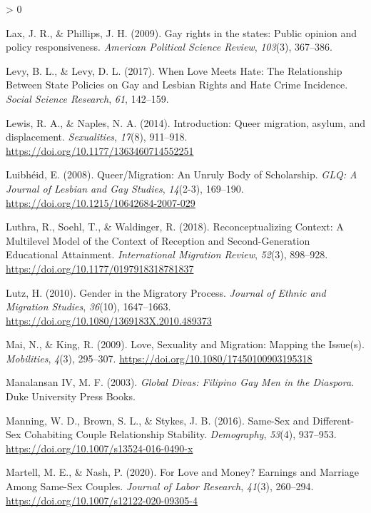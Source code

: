 \documentclass[
  12pt,
]{article}
\newlength{\cslhangindent}
\newenvironment{CSLReferences}[2] %
 {%
  \setlength{\parindent}{0pt}
  \ifodd #1 \everypar{\setlength{\hangindent}{\cslhangindent}}\ignorespaces\fi
  \ifnum #2 > 0
  \setlength{\parskip}{#2\baselineskip}
  \fi
 }%
 {}
\begin{document}
\begin{CSLReferences}{1}{0}
\leavevmode\hypertarget{ref-lax_2009}{}%
Lax, J. R., \& Phillips, J. H. (2009). Gay rights in the states: Public opinion and policy responsiveness. \emph{American Political Science Review}, \emph{103}(3), 367--386.

\leavevmode\hypertarget{ref-levy_2017}{}%
Levy, B. L., \& Levy, D. L. (2017). When {Love Meets Hate}: The {Relationship Between State Policies} on {Gay} and {Lesbian Rights} and {Hate Crime Incidence}. \emph{Social Science Research}, \emph{61}, 142--159.

\leavevmode\hypertarget{ref-lewis_2014}{}%
Lewis, R. A., \& Naples, N. A. (2014). Introduction: Queer migration, asylum, and displacement. \emph{Sexualities}, \emph{17}(8), 911--918. \url{https://doi.org/10.1177/1363460714552251}

\leavevmode\hypertarget{ref-luibheid_2008}{}%
Luibhéid, E. (2008). Queer/{Migration}: An {Unruly Body} of {Scholarship}. \emph{GLQ: A Journal of Lesbian and Gay Studies}, \emph{14}(2-3), 169--190. \url{https://doi.org/10.1215/10642684-2007-029}

\leavevmode\hypertarget{ref-luthra_2018}{}%
Luthra, R., Soehl, T., \& Waldinger, R. (2018). Reconceptualizing {Context}: A {Multilevel Model} of the {Context} of {Reception} and {Second}-{Generation Educational Attainment}. \emph{International Migration Review}, \emph{52}(3), 898--928. \url{https://doi.org/10.1177/0197918318781837}

\leavevmode\hypertarget{ref-lutz_2010}{}%
Lutz, H. (2010). Gender in the {Migratory Process}. \emph{Journal of Ethnic and Migration Studies}, \emph{36}(10), 1647--1663. \url{https://doi.org/10.1080/1369183X.2010.489373}

\leavevmode\hypertarget{ref-mai_2009}{}%
Mai, N., \& King, R. (2009). Love, {Sexuality} and {Migration}: Mapping the {Issue}(s). \emph{Mobilities}, \emph{4}(3), 295--307. \url{https://doi.org/10.1080/17450100903195318}

\leavevmode\hypertarget{ref-manalansaniv_2003}{}%
Manalansan IV, M. F. (2003). \emph{Global {Divas}: Filipino {Gay Men} in the {Diaspora}}. {Duke University Press Books}.

\leavevmode\hypertarget{ref-manning_2016}{}%
Manning, W. D., Brown, S. L., \& Stykes, J. B. (2016). Same-{Sex} and {Different}-{Sex Cohabiting Couple Relationship Stability}. \emph{Demography}, \emph{53}(4), 937--953. \url{https://doi.org/10.1007/s13524-016-0490-x}

\leavevmode\hypertarget{ref-martell_2020}{}%
Martell, M. E., \& Nash, P. (2020). For {Love} and {Money}? Earnings and {Marriage Among Same}-{Sex Couples}. \emph{Journal of Labor Research}, \emph{41}(3), 260--294. \url{https://doi.org/10.1007/s12122-020-09305-4}


\end{CSLReferences}
\end{document}
